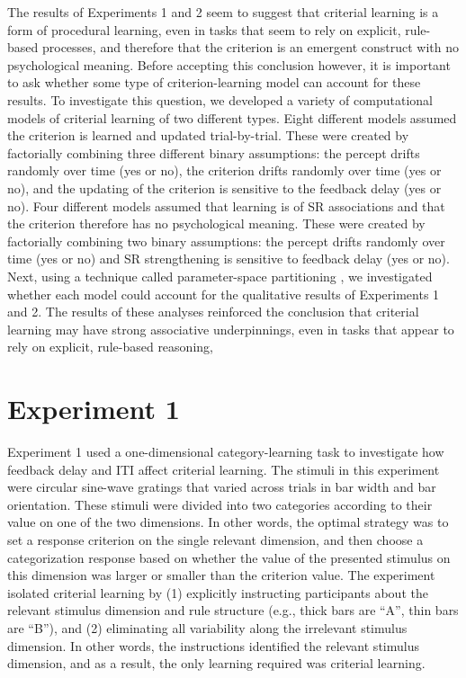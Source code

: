 \documentclass[doc, floatsintext]{apa7}
\begin{document}
The results of Experiments 1 and 2 seem to suggest that
criterial learning is a form of procedural learning, even in
tasks that seem to rely on explicit, rule-based processes,
and therefore that the criterion is an emergent construct
with no psychological meaning. Before accepting this
conclusion however, it is important to ask whether some type
of criterion-learning model can account for these results.
To investigate this question, we developed a variety of
computational models of criterial learning of two different
types. Eight different models assumed the criterion is
learned and updated trial-by-trial. These were created by
factorially combining three different binary assumptions:
the percept drifts randomly over time (yes or no), the
criterion drifts randomly over time (yes or no), and the
updating of the criterion is sensitive to the feedback delay
(yes or no). Four different models assumed that learning is
of SR associations and that the criterion therefore has no
psychological meaning. These were created by factorially
combining two binary assumptions: the percept drifts
randomly over time (yes or no) and SR strengthening is
sensitive to feedback delay (yes or no). Next, using a
technique called parameter-space partitioning
\parencite{pitt2006global}, we investigated whether each
model could account for the qualitative results of
Experiments 1 and 2. The results of these analyses
reinforced the conclusion that criterial learning may have
strong associative underpinnings, even in tasks that appear
to rely on explicit, rule-based reasoning, 

\section{Experiment 1}
Experiment 1 used a one-dimensional category-learning task
to investigate how feedback delay and ITI affect criterial
learning. The stimuli in this experiment were circular
sine-wave gratings that varied across trials in bar width
and bar orientation. These stimuli were divided into two
categories according to their value on one of the two
dimensions. In other words, the optimal strategy was to set
a response criterion on the single relevant dimension, and
then choose a categorization response based on whether the
value of the presented stimulus on this dimension was larger
or smaller than the criterion value.  The experiment
isolated criterial learning by (1) explicitly instructing
participants about the relevant stimulus dimension and rule
structure (e.g., thick bars are ``A'', thin bars are ``B''),
and (2) eliminating all variability along the irrelevant
stimulus dimension. In other words, the instructions
identified the relevant stimulus dimension, and as a result,
the only learning required was criterial learning. 
\end{document}
